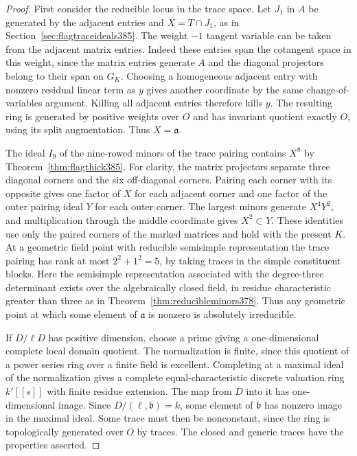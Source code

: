 \documentclass[a4paper,11pt]{article}
\theoremstyle{definition}
\theoremstyle{remark}
\numberwithin{equation}{section}
\begin{document}
\begin{proof}
First consider the reducible locus in the trace space. Let
\(J_1\) in \(A\) be generated by the adjacent entries and
\(X=T\cap J_1\), as in Section~\ref{sec:flagtraceideals385}.
The weight \(-1\) tangent variable can be taken from the
adjacent matrix entries. Indeed these entries span the
cotangent space in this weight, since the matrix entries
generate \(A\) and the diagonal projectors belong to their
span on \(G_K\). Choosing a homogeneous adjacent entry
with nonzero residual linear term as \(y\) gives another
coordinate by the same change-of-variables argument.
Killing all adjacent entries therefore kills \(y\).
The resulting ring is generated by positive weights over
\(O\) and has invariant quotient exactly \(O\), using its
split augmentation. Thus \(X=\mathfrak a\).

The ideal \(I_9\) of the nine-rowed minors of the trace
pairing contains \(X^8\) by Theorem~\ref{thm:flagthick385}.
For clarity, the matrix projectors separate three diagonal
corners and the six off-diagonal corners. Pairing each
corner with its opposite gives one factor of \(X\) for
each adjacent corner and one factor of the outer pairing
ideal \(Y\) for each outer corner. The largest minors
generate \(X^4Y^2\), and multiplication through the middle
coordinate gives \(X^2\subset Y\). These identities use
only the paired corners of the marked matrices and hold
with the present \(K\). At a geometric field point with
reducible semisimple representation the trace pairing
has rank at most \(2^2+1^2=5\), by taking traces in the
simple constituent blocks. Here the semisimple representation
associated with the degree-three determinant exists over the
algebraically closed field, in residue characteristic greater
than three as in Theorem~\ref{thm:reducibleminors378}.
Thus any geometric point at which some element of
\(\mathfrak a\) is nonzero is absolutely irreducible.

If \(D/\ell D\) has positive dimension, choose a prime
giving a one-dimensional complete local domain quotient.
The normalization is finite, since this quotient of a
power series ring over a finite field is excellent. Completing
at a maximal ideal of the normalization gives a complete
equal-characteristic discrete valuation ring \(k'[[s]]\)
with finite residue extension. The map from \(D\) into it
has one-dimensional image. Since \(D/(\ell,\mathfrak b)=k\),
some element of \(\mathfrak b\) has nonzero image in the
maximal ideal. Some trace must then be nonconstant, since
the ring is topologically generated over \(O\) by traces.
The closed and generic traces have the properties asserted.


\end{proof}
\end{document}
